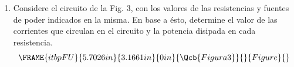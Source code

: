 \documentclass{article}
\begin{document}
\begin{enumerate}
\begin{enumerate}
\pagebreak 
\end{enumerate}

\item Considere el circuito de la Fig. 3, con los valores de las
resistencias y fuentes de poder indicados en la misma. En base a \'{e}sto,
determine el valor de las corrientes que circulan en el circuito y la
potencia disipada en cada resistencia.%
\begin{equation*}
\FRAME{itbpFU}{5.7026in}{3.1661in}{0in}{\Qcb{Figura 3}}{}{Figure}{\special%
{language "Scientific Word";type "GRAPHIC";maintain-aspect-ratio
TRUE;display "USEDEF";valid_file "T";width 5.7026in;height 3.1661in;depth
0in;original-width 7.3025in;original-height 4.0413in;cropleft "0";croptop
"1";cropright "1";cropbottom "0";tempfilename
'TI86TE03.wmf';tempfile-properties "XPR";}}
\end{equation*}
\end{enumerate}
\end{document}
